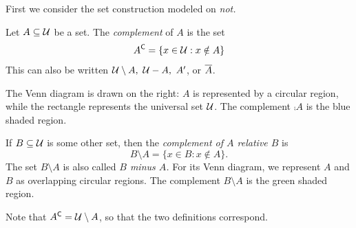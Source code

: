 \begin{minipage}{0.67\textwidth}
First we consider the set construction modeled on \emph{not.}

\begin{defn}{}{}
Let $A\subseteq\mathcal{U}$ be a set. The \emph{complement} of $A$ is the set
\[{A}^{\mathsf{C}}=\{x\in\mathcal{U}:x\notin A\}\]
This can also be written $\mathcal{U}\setminus A,\ \mathcal{U}-A,\ A'$, or $\overline{A}$.\par

The Venn diagram is drawn on the right: $A$ is represented by a circular region, while the rectangle represents the universal set $\mathcal{U}$. The complement $\comp A$ is the blue shaded region.\par

If $B\subseteq\mathcal{U}$ is some other set, then the \emph{complement of $A$ relative $B$} is
\[B\setminus A=\{x\in B:x\notin A\}.\]
The set $B\setminus A$ is also called \emph{$B$ minus $A$.} For its Venn diagram, we represent $A$ and $B$ as overlapping circular regions. The complement $B\setminus A$ is the green shaded region.\par

Note that ${A}^{\mathsf{C}}=\mathcal{U}\setminus A$, so that the two definitions correspond. 
\end{defn}
\end{minipage}\qquad

